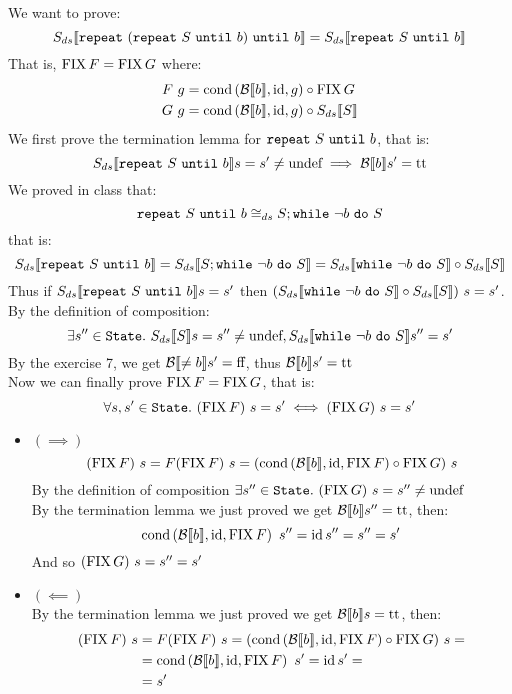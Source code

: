 \alternativeSolution
We want to prove:
\[ \Sds{\wrepeat{(\wrepeat{S}{b})}{b}} = \Sds{\wrepeat{S}{b}} \]
That is, $\FIX F = \FIX G$ where:
\begin{align*}
    F\ g &= \cond{\Bool{b}}{\id}{g} \circ \FIX G \\
    G\ g &= \cond{\Bool{b}}{\id}{g} \circ \Sds{S}
\end{align*}
We first prove the termination lemma for $\wrepeat{S}{b}$, that is:
\[ \Sds{\wrepeat{S}{b}} s = s' \neq \undef \implies \Bool{b} s' = \True \]
We proved in class that:
\[ \wrepeat{S}{b} \DScong S;\wwhile{\neg b}{S} \]
that is:
\[ \Sds{\wrepeat{S}{b}} = \Sds{S;\wwhile{\neg b}{S}} = \Sds{\wwhile{\neg b}{S}} \circ \Sds{S} \]
Thus if $\Sds{\wrepeat{S}{b}} s = s'$ then $(\Sds{\wwhile{\neg b}{S}} \circ \Sds{S})\ s = s'$. \\
By the definition of composition:
\[ \exists s'' \in \State.\ \Sds{S} s = s'' \neq \undef, \Sds{\wwhile{\neg b}{S}} s'' = s' \]
By the exercise 7, we get $\Bool{\neq b} s' = \False$, thus $\Bool{b} s' = \True$ \\
Now we can finally prove $\FIX F = \FIX G$, that is:
\[ \forall s, s' \in \State.\ (\FIX F)\ s = s' \iff (\FIX G)\ s = s' \]
\begin{itemize}
    \item $(\implies)$
        \[ (\FIX F)\ s = F(\FIX F)\ s = (\cond{\Bool{b}}{\id}{\FIX F} \circ \FIX G)\ s \]
        By the definition of composition $\exists s'' \in \State.\ (\FIX G)\ s = s'' \neq \undef$ \\
        By the termination lemma we just proved we get $\Bool{b} s'' = \True$, then:
        \[ \cond{\Bool{b}}{\id}{\FIX F}\ s'' = \id s'' = s'' = s' \]
        And so $(\FIX G)\ s = s'' = s'$
    \item $(\impliedby)$ \\
        By the termination lemma we just proved we get $\Bool{b} s = \True$, then:
        \begin{align*}
            (\FIX F)\ s &= F(\FIX F)\ s = (\cond{\Bool{b}}{\id}{\FIX F} \circ \FIX G)\ s = \\
            &= \cond{\Bool{b}}{\id}{\FIX F}\ s' = \id s' = \\
            &= s'
        \end{align*}
\end{itemize}
